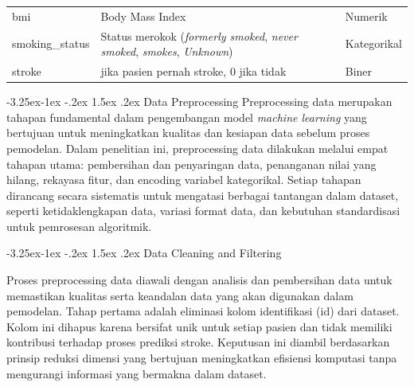 \documentclass[10pt]{article}
\makeatletter
\renewcommand\subsection{\@startsection{subsection}{2}{\z@}%
  {-3.25ex\@plus -1ex \@minus -.2ex}%
  {1.5ex \@plus .2ex}%
  {\normalfont\itshape\normalsize}}
\renewcommand\subsubsection{\@startsection{subsubsection}{3}{\z@}%
  {-3.25ex\@plus -1ex \@minus -.2ex}%
  {1.5ex \@plus .2ex}%
  {\normalfont\itshape\normalsize}}
\makeatother
\begin{document}
\begin{multicols}{2}
\begin{table}[H]
{\begin{tabular}{>{\raggedright\arraybackslash}p{2cm}>{\raggedright\arraybackslash}p{3cm}>{\raggedright\arraybackslash}p{1.5cm}}
                bmi                 & Body Mass Index                                                                                                          & Numerik            \\
                smoking\_status     & Status merokok (\textit{formerly smoked}, \textit{never smoked}, \textit{smokes}, \textit{Unknown})                      & Kategorikal        \\
                stroke              & 1 jika pasien pernah stroke, 0 jika tidak                                                                                & Biner              \\
                \bottomrule
            \end{tabular}}
    \end{table}

    \subsection{Data Preprocessing}
    Preprocessing data merupakan tahapan fundamental dalam pengembangan model
    \textit{machine learning} yang bertujuan untuk meningkatkan kualitas dan
    kesiapan data sebelum proses pemodelan. Dalam penelitian ini, preprocessing
    data dilakukan melalui empat tahapan utama: pembersihan dan penyaringan data,
    penanganan nilai yang hilang, rekayasa fitur, dan encoding variabel
    kategorikal. Setiap tahapan dirancang secara sistematis untuk mengatasi
    berbagai tantangan dalam dataset, seperti ketidaklengkapan data, variasi format
    data, dan kebutuhan standardisasi untuk pemrosesan algoritmik.

    \subsubsection{Data Cleaning and Filtering}

    Proses preprocessing data diawali dengan analisis dan pembersihan data untuk
    memastikan kualitas serta keandalan data yang akan digunakan dalam pemodelan.
    Tahap pertama adalah eliminasi kolom identifikasi (id) dari dataset. Kolom ini
    dihapus karena bersifat unik untuk setiap pasien dan tidak memiliki kontribusi
    terhadap proses prediksi stroke. Keputusan ini diambil berdasarkan prinsip
    reduksi dimensi yang bertujuan meningkatkan efisiensi komputasi tanpa
    mengurangi informasi yang bermakna dalam dataset.


\end{multicols}
\end{document}
